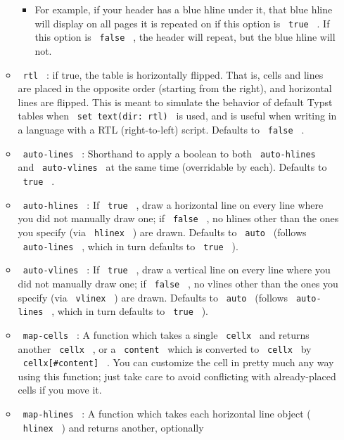 \begin{enumerate}
\begin{itemize}
    \begin{itemize}
    \tightlist
    \item
      For example, if your header has a blue hline under it, that blue
      hline will display on all pages it is repeated on if this option
      is \texttt{\ true\ } . If this option is \texttt{\ false\ } , the
      header will repeat, but the blue hline will not.
    \end{itemize}
  \item
    \texttt{\ rtl\ } : if true, the table is horizontally flipped. That
    is, cells and lines are placed in the opposite order (starting from
    the right), and horizontal lines are flipped. This is meant to
    simulate the behavior of default Typst tables when
    \texttt{\ set\ text(dir:\ rtl)\ } is used, and is useful when
    writing in a language with a RTL (right-to-left) script. Defaults to
    \texttt{\ false\ } .
  \item
    \texttt{\ auto-lines\ } : Shorthand to apply a boolean to both
    \texttt{\ auto-hlines\ } and \texttt{\ auto-vlines\ } at the same
    time (overridable by each). Defaults to \texttt{\ true\ } .
  \item
    \texttt{\ auto-hlines\ } : If \texttt{\ true\ } , draw a horizontal
    line on every line where you did not manually draw one; if
    \texttt{\ false\ } , no hlines other than the ones you specify (via
    \texttt{\ hlinex\ } ) are drawn. Defaults to \texttt{\ auto\ }
    (follows \texttt{\ auto-lines\ } , which in turn defaults to
    \texttt{\ true\ } ).
  \item
    \texttt{\ auto-vlines\ } : If \texttt{\ true\ } , draw a vertical
    line on every line where you did not manually draw one; if
    \texttt{\ false\ } , no vlines other than the ones you specify (via
    \texttt{\ vlinex\ } ) are drawn. Defaults to \texttt{\ auto\ }
    (follows \texttt{\ auto-lines\ } , which in turn defaults to
    \texttt{\ true\ } ).
  \item
    \texttt{\ map-cells\ } : A function which takes a single
    \texttt{\ cellx\ } and returns another \texttt{\ cellx\ } , or a
    \texttt{\ content\ } which is converted to \texttt{\ cellx\ } by
    \texttt{\ cellx{[}\#content{]}\ } . You can customize the cell in
    pretty much any way using this function; just take care to avoid
    conflicting with already-placed cells if you move it.
  \item
    \texttt{\ map-hlines\ } : A function which takes each horizontal
    line object ( \texttt{\ hlinex\ } ) and returns another, optionally

\end{itemize}
\end{enumerate}
